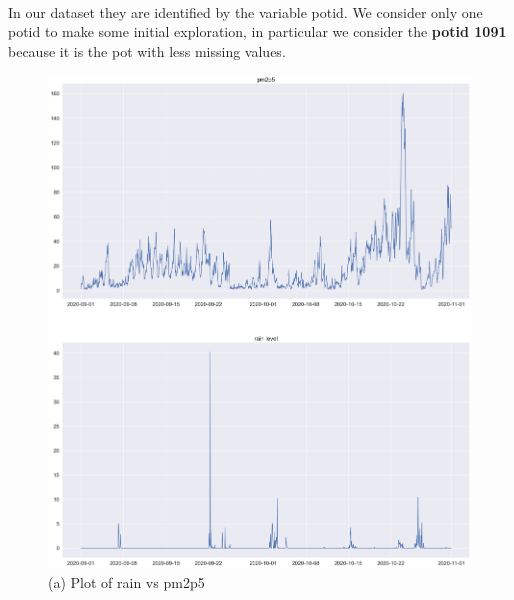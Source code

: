 \documentclass{article}
\begin{document}
\\In our dataset they are identified by the variable potid. 
We consider only one potid to make some initial exploration, in particular we consider the \textbf{potid 1091} because it is the pot with less missing values.

 \begin{figure}[h!]
    \centering
    \begin{minipage}[t]{0.4\textwidth}
      \centering
      \includegraphics[scale=0.18]{plotpioggia.png}
      \caption{(a) Plot of rain vs pm2p5}
    \end{minipage}\hfill
    \begin{minipage}[t]{0.4\textwidth}
      \centering

\end{minipage}
\end{figure}
\end{document}

